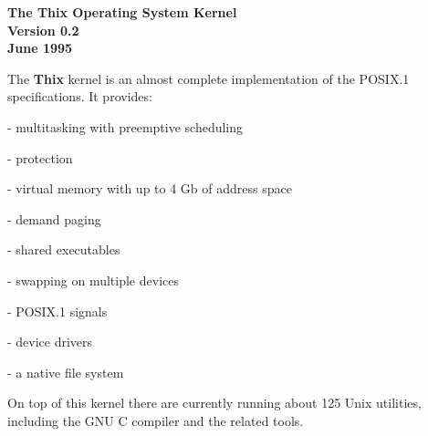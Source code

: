 \begin{slide}{}


{\small \bf \center The Thix Operating System Kernel\\
\center Version 0.2\\
\center June 1995\\
}

\vspace{2cm}

{\tiny The {\bf Thix} kernel is an almost complete implementation of the
POSIX.1 specifications.  It provides:


\hspace{1cm} - multitasking with preemptive scheduling

\hspace{1cm} - protection

\hspace{1cm} - virtual memory with up to 4 Gb of address space

\hspace{1cm} - demand paging

\hspace{1cm} - shared executables

\hspace{1cm} - swapping on multiple devices

\hspace{1cm} - POSIX.1 signals

\hspace{1cm} - device drivers

\hspace{1cm} - a native file system


On top of this kernel there are currently running about 125
Unix utilities, including the GNU C compiler and the related tools.

}

\end{slide}
